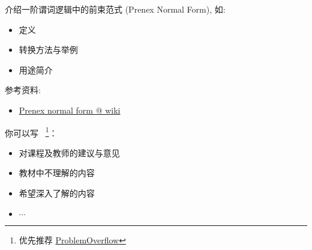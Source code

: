 \documentclass[a4paper, justified]{tufte-handout}
\begin{document}
\begin{solution}
\end{solution}

\begin{ot}[前束范式]
  介绍一阶谓词逻辑中的前束范式 (Prenex Normal Form), 如:
  \begin{itemize}
    \item 定义
    \item 转换方法与举例
    \item 用途简介
  \end{itemize}

  \noindent 参考资料:
  \begin{itemize}
    \item \href{https://en.wikipedia.org/wiki/Prenex\_normal\_form}{Prenex normal form @ wiki}
  \end{itemize}
\end{ot}

\begin{solution}
\end{solution}

\begincorrection

\beginfb

你可以写
~\footnote{优先推荐 \href{problemoverflow.top}{ProblemOverflow}}：
\begin{itemize}
  \item 对课程及教师的建议与意见
  \item 教材中不理解的内容
  \item 希望深入了解的内容
  \item $\cdots$
\end{itemize}
\end{document}
